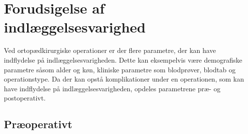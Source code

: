 \section{Forudsigelse af indlæggelsesvarighed}
Ved ortopædkirurgiske operationer er der flere parametre, der kan have indflydelse på indlæggelsesvarigheden. Dette kan eksempelvis være demografiske parametre såsom alder og køn, kliniske parametre som blodprøver, blodtab og operationstype. Da der kan opstå komplikationer under en operationen, som kan have indflydelse på indlæggelsesvarigheden, opdeles parametrene præ- og postoperativt.

\subsection{Præoperativt}
